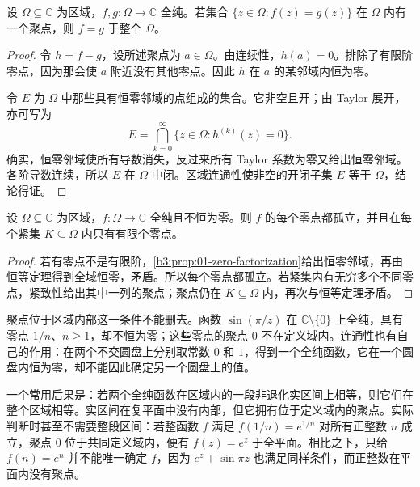 \begin{theorem}[恒等定理]\label{b3:thm:01-identity}
设 \(\Omega\subseteq\mathbb C\) 为区域，\(f,g:\Omega\to\mathbb C\) 全纯。若集合 \(\{z\in\Omega:f(z)=g(z)\}\) 在 \(\Omega\) 内有一个聚点，则 \(f=g\) 于整个 \(\Omega\)。
\end{theorem}
\begin{proof}
令 \(h=f-g\)，设所述聚点为 \(a\in\Omega\)。由连续性，\(h(a)=0\)。排除了有限阶零点，因为那会使 \(a\) 附近没有其他零点。因此 \(h\) 在 \(a\) 的某邻域内恒为零。

令 \(E\) 为 \(\Omega\) 中那些具有恒零邻域的点组成的集合。它非空且开；由 Taylor 展开，亦可写为
\[
E=\bigcap_{k=0}^\infty\{z\in\Omega:h^{(k)}(z)=0\}.
\]
确实，恒零邻域使所有导数消失，反过来所有 Taylor 系数为零又给出恒零邻域。各阶导数连续，所以 \(E\) 在 \(\Omega\) 中闭。区域连通性使非空的开闭子集 \(E\) 等于 \(\Omega\)，结论得证。
\end{proof}

\begin{corollary}\label{b3:cor:01-discrete-zeros}
设 \(\Omega\subseteq\mathbb C\) 为区域，\(f:\Omega\to\mathbb C\) 全纯且不恒为零。则 \(f\) 的每个零点都孤立，并且在每个紧集 \(K\subseteq\Omega\) 内只有有限个零点。
\end{corollary}
\begin{proof}
若有零点不是有限阶，\cref{b3:prop:01-zero-factorization}给出恒零邻域，再由恒等定理得到全域恒零，矛盾。所以每个零点都孤立。若紧集内有无穷多个不同零点，紧致性给出其中一列的聚点；聚点仍在 \(K\subseteq\Omega\) 内，再次与恒等定理矛盾。
\end{proof}

聚点位于区域内部这一条件不能删去。函数 \(\sin(\pi/z)\) 在 \(\mathbb C\setminus\{0\}\) 上全纯，具有零点 \(1/n\)、\(n\geq1\)，却不恒为零；这些零点的聚点 \(0\) 不在定义域内。连通性也有自己的作用：在两个不交圆盘上分别取常数 \(0\) 和 \(1\)，得到一个全纯函数，它在一个圆盘内恒为零，却不能因此确定另一个圆盘上的值。

\ProseParagraphBreak

一个常用后果是：若两个全纯函数在区域内的一段非退化实区间上相等，则它们在整个区域相等。实区间在复平面中没有内部，但它拥有位于定义域内的聚点。实际判断时甚至不需要整段区间：若整函数 \(f\) 满足 \(f(1/n)=e^{1/n}\) 对所有正整数 \(n\) 成立，聚点 \(0\) 位于共同定义域内，便有 \(f(z)=e^z\) 于全平面。相比之下，只给 \(f(n)=e^n\) 并不能唯一确定 \(f\)，因为 \(e^z+\sin\pi z\) 也满足同样条件，而正整数在平面内没有聚点。


